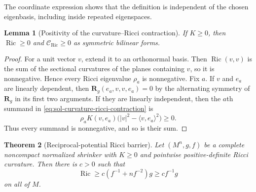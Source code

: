 \documentclass[10pt]{coll-l}
\newtheorem{theorem}{Theorem}[chapter]
\newtheorem{lemma}[theorem]{Lemma}
\theoremstyle{definition}
\theoremstyle{remark}
\numberwithin{section}{chapter}
\numberwithin{equation}{chapter}
\newcommand{\Ric}{\operatorname{Ric}}
\begin{document}
The coordinate expression shows that the definition is independent of the
chosen eigenbasis, including inside repeated eigenspaces.

\begin{lemma}[Positivity of the curvature--Ricci contraction]
\label{lem:sol-curvature-ricci-positive}
If $K\geq0$, then $\Ric\geq0$ and
$\mathcal C_{\Ric}\geq0$ as symmetric bilinear forms.
\end{lemma}

\begin{proof}
For a unit vector $v$, extend it to an orthonormal basis.  Then
$\Ric(v,v)$ is the sum of the sectional curvatures of the planes containing
$v$, so it is nonnegative.  Hence every Ricci eigenvalue $\rho_a$ is
nonnegative.  Fix $a$.  If $v$ and $e_a$ are linearly dependent, then
$\mathbf R_g(e_a,v,v,e_a)=0$ by the alternating symmetry of
$\mathbf R_g$ in its first
two arguments.  If they are linearly independent, then the $a$th
summand in \eqref{eq:sol-curvature-ricci-contraction} is
\[
 \rho_a K(v,e_a)
       \bigl(|v|^2-\langle v,e_a\rangle^2\bigr)\geq0.
\]
Thus every summand is nonnegative, and so is their sum.
\end{proof}

\begin{theorem}[Reciprocal-potential Ricci barrier]
\label{thm:sol-mw-ricci-barrier}
Let $(M^n,g,f)$ be a complete noncompact normalized shrinker with
$K\geq0$ and pointwise positive-definite Ricci curvature.  Then there is
$c>0$ such that
\begin{equation}
        \Ric\geq c(f^{-1}+nf^{-2})g\geq cf^{-1}g           \label{eq:sol-mw-ricci-lower}
\end{equation}
on all of $M$.
\end{theorem}
\end{document}
